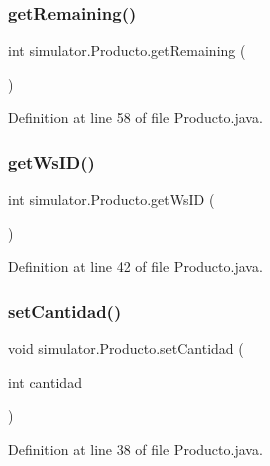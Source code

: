 \subsubsection{\texorpdfstring{get\+Remaining()}{getRemaining()}}
{\footnotesize\ttfamily int simulator.\+Producto.\+get\+Remaining (\begin{DoxyParamCaption}{ }\end{DoxyParamCaption})}



Definition at line 58 of file Producto.\+java.

\mbox{\label{classsimulator_1_1_producto_a98f367bc18c4de722ee6a08a4ba0a31e}} 
\subsubsection{\texorpdfstring{get\+Ws\+I\+D()}{getWsID()}}
{\footnotesize\ttfamily int simulator.\+Producto.\+get\+Ws\+ID (\begin{DoxyParamCaption}{ }\end{DoxyParamCaption})}



Definition at line 42 of file Producto.\+java.

\mbox{\label{classsimulator_1_1_producto_ac48ac8d5a9dafc76dde405d60bda6611}} 
\subsubsection{\texorpdfstring{set\+Cantidad()}{setCantidad()}}
{\footnotesize\ttfamily void simulator.\+Producto.\+set\+Cantidad (\begin{DoxyParamCaption}\item[{int}]{cantidad }\end{DoxyParamCaption})}



Definition at line 38 of file Producto.\+java.

\mbox{\label{classsimulator_1_1_producto_a9db8049ac3a8b1da4117e548bc7b005f}} 
